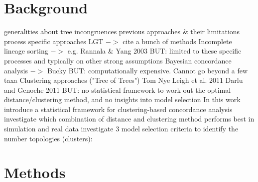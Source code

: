 \documentclass[10pt]{bmc_article}
\newenvironment{bmcformat}{\baselineskip20pt\sloppy\setboolean{publ}{false}}{\baselineskip20pt\sloppy}
\begin{document}
\begin{bmcformat}








\section*{Background}
\begin{outline}[enumerate]
  \1 generalities about tree incongruences
  \1 previous approaches \& their limitations
     \2 process specific approaches
        \3 LGT $->$ cite a bunch of methods
        \3 Incomplete lineage sorting $->$ e.g. Rannala \& Yang 2003
        \3 BUT: limited to these specific processes and typically
           on other strong assumptions
     \2 Bayesian concordance analysis $->$ Bucky 
        \3 BUT: computationally expensive. Cannot go beyond a few taxa
     \2 Clustering approaches ("Tree of Trees")
        \3 Tom Nye 
        \3 Leigh et al. 2011 
        \3 Darlu and Genoche 2011
        \3 BUT: no statistical framework to work out the optimal 
           distance/clustering method, and no insights into model selection
  \1 In this work
     \2 introduce a statistical framework for clustering-based concordance 
        analysis
     \2 investigate which combination of distance and clustering method 
        performs best in simulation and real data
     \2 investigate 3 model selection criteria to identify the number 
        topologies (clusters):
\end{outline}


\section*{Methods}

\end{bmcformat}
\end{document}
